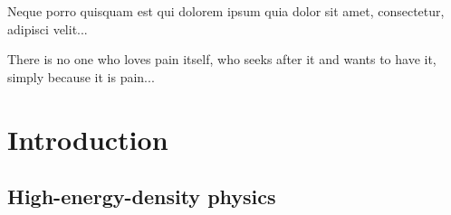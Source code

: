 \begin{savequote}[8cm]
\textlatin{Neque porro quisquam est qui dolorem ipsum quia dolor sit amet, consectetur, adipisci velit...}

There is no one who loves pain itself, who seeks after it and wants to have it, simply because it is pain...
\end{savequote}

\chapter{\label{ch:1-intro}Introduction} 

\minitoc

\section{High-energy-density physics}
